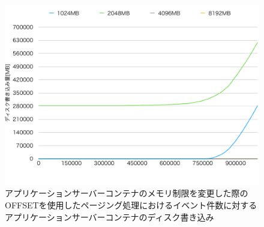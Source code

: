 \documentclass[../../../../../main]{subfiles}
\begin{document}
    \begin{figure}[H]
        \centering
        \includegraphics[width=12cm]{graph}
        \caption{アプリケーションサーバーコンテナのメモリ制限を変更した際のOFFSETを使用したページング処理におけるイベント件数に対するアプリケーションサーバーコンテナのディスク書き込み}
        \label{fig:paging-offset-change-app-memory-limit-app-disk-in-app_4_db_1_1024}
    \end{figure}
\end{document}
